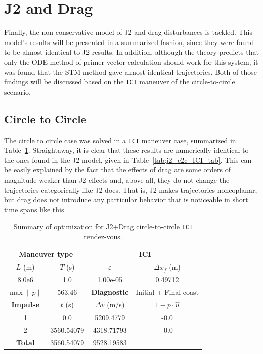 \newpage
\FloatBarrier
\section{J2 and Drag}

Finally, the non-conservative model of J2 and drag disturbances is tackled. This model's results will be presented in a summarized fashion, since they were found to be almost identical to J2 results. In addition, although the theory predicts that only the ODE method of primer vector calculation should work for this system, it was found that the STM method gave almost identical trajectories. Both of those findings will be discussed based on the \texttt{ICI} maneuver of the circle-to-circle scenario.

\subsection{Circle to Circle}

The circle to circle case was solved in a \texttt{ICI} maneuver case, summarized in Table~\ref{tab:jd_c2c_ICI_tab}. Straightaway, it is clear that these results are numerically identical to the ones found in the J2 model, given in Table~\ref{tab:j2_c2c_ICI_tab}. This can be easily explained by the fact that the effects of drag are some orders of magnitude weaker than J2 effects and, above all, they do not change the trajectories categorically like J2 does. That is, J2 makes trajectories noncoplanar, but drag does not introduce any particular behavior that is noticeable in short time spans like this.
    
\begin{table}[htpb]
    \centering
    \begin{tabular}{cccc} \toprule
    \multicolumn{2}{c}{\textbf{Maneuver type}} & \multicolumn{2}{c}{ICI} \\ \midrule
    \(L\) (m) & \(T\) (s) & \(\varepsilon\) & \(\Delta x_{f}\) (m)    \\ \midrule
    8.0e6          & 1.0          & 1.00e-05                & 0.49712                        \\ \midrule
    \(\max \lVert p \rVert\) & 563.46     & \textbf{Diagnostic}   & Initial + Final coast        \\ \midrule
    \textbf{Impulse} & \(t\) (s) & \(\Delta v\) (m/s) & \(1 - p \cdot \hat{u}\) \\ \midrule
    1                 & 0.0          & 5209.4779             & -0.0                    \\
    2                 & 3560.54079          & 4318.71793             & -0.0                    \\\midrule
    \textbf{Total}   & 3560.54079          & 9528.19583             &                     \\ \bottomrule   
    \end{tabular}
    \caption{Summary of optimization for J2+Drag circle-to-circle \texttt{ICI} rendez-vous.}
    \label{tab:jd_c2c_ICI_tab}
\end{table}

